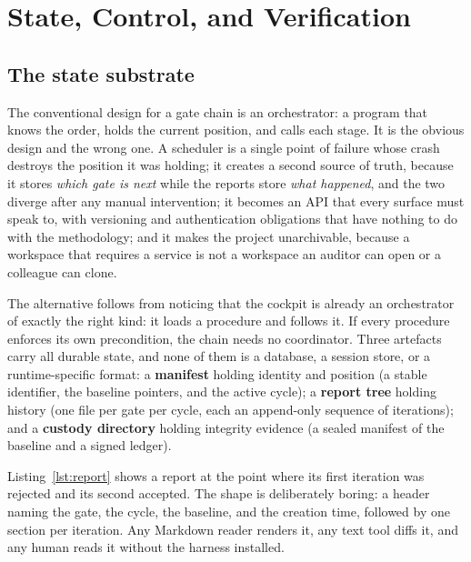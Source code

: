 \documentclass[10pt,a4paper]{article}
\theoremstyle{definition}
\theoremstyle{plain}
\theoremstyle{principle}
\begin{document}
\section{State, Control, and Verification}\label{sec:state}

\subsection{The state substrate}

The conventional design for a gate chain is an orchestrator: a program that knows the order, holds
the current position, and calls each stage. It is the obvious design and the wrong one. A
scheduler is a single point of failure whose crash destroys the position it was holding; it
creates a second source of truth, because it stores \emph{which gate is next} while the reports
store \emph{what happened}, and the two diverge after any manual intervention; it becomes an API
that every surface must speak to, with versioning and authentication obligations that have nothing
to do with the methodology; and it makes the project unarchivable, because a workspace that
requires a service is not a workspace an auditor can open or a colleague can clone.

The alternative follows from noticing that the cockpit is already an orchestrator of exactly the
right kind: it loads a procedure and follows it. If every procedure enforces its own precondition,
the chain needs no coordinator. Three artefacts carry all durable state, and none of them is a
database, a session store, or a runtime-specific format: a \textbf{manifest} holding identity and
position (a stable identifier, the baseline pointers, and the active cycle); a \textbf{report tree}
holding history (one file per gate per cycle, each an append-only sequence of iterations); and a
\textbf{custody directory} holding integrity evidence (a sealed manifest of the baseline and a
signed ledger).

Listing~\ref{lst:report} shows a report at the point where its first iteration was rejected and its
second accepted. The shape is deliberately boring: a header naming the gate, the cycle, the
baseline, and the creation time, followed by one section per iteration. Any Markdown reader renders
it, any text tool diffs it, and any human reads it without the harness installed.
\end{document}
